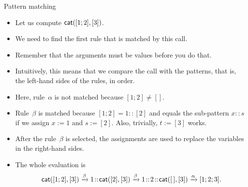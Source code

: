 %
\begin{frame}{Pattern matching}

  \begin{itemize}

    \item Let us compute \(\textsf{cat}([1;2],[3])\).

    \item We need to find the first rule that is matched by this call.

    \item Remember that the arguments must be values before you do
      that.

    \item Intuitively, this means that we compare the call with the
      patterns, that is, the left\hyp{}hand sides of the rules, in
      order.

    \item Here, rule~\(\alpha\) is not matched because \([1;2] \neq
      []\).

    \item Rule~\(\beta\) is matched because \([1;2] = 1::[2]\) and
      equals the sub\hyp{}pattern \(x::s\) if we assign \(x := 1\) and
      \(s := [2]\). Also, trivially, \(t := [3]\) works.

    \item After the rule~\(\beta\) is selected, the assignments are
      used to replace the variables in the right\hyp{}hand sides.

    \item The whole evaluation is
    \begin{equation*}
      \textsf{cat}([1;2],[3])
      \xrightarrow{\beta}
      {1}\!::\!{\textsf{cat}([2],[3])}
      \xrightarrow{\beta}
      {1}\!::\!{{2}\!::\!{\textsf{cat}([\,],[3])}}
      \xrightarrow{\alpha}
                    [1;2;3].
    \end{equation*}
  \end{itemize}

\end{frame}
